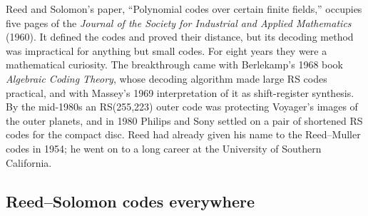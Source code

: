 \begin{history}
Reed and Solomon's paper, ``Polynomial codes over certain finite fields,'' occupies five pages of
the \emph{Journal of the Society for Industrial and Applied Mathematics} (1960). It defined the codes
and proved their distance, but its decoding method was impractical for anything but small codes. For
eight years they were a mathematical curiosity. The breakthrough came with Berlekamp's 1968 book
\emph{Algebraic Coding Theory}, whose decoding algorithm made large RS codes practical, and with
Massey's 1969 interpretation of it as shift-register synthesis. By the mid-1980s an RS(255,223) outer
code was protecting Voyager's images of the outer planets, and in 1980 Philips and Sony settled on a
pair of shortened RS codes for the compact disc. Reed had already given his name to the Reed--Muller
codes in 1954; he went on to a long career at the University of Southern California.
\end{history}

\subsection{Reed--Solomon codes everywhere}

